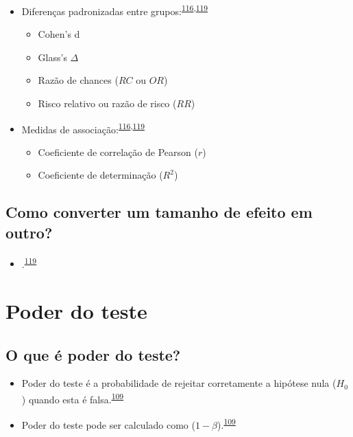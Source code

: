 \documentclass[
  a4paper,
]{book}
\providecommand{\tightlist}{%
  \setlength{\itemsep}{0pt}\setlength{\parskip}{0pt}}
\begin{document}
\begin{itemize}
\item
  Diferenças padronizadas entre grupos:\textsuperscript{\protect\hyperlink{ref-Sullivan2012}{116},\protect\hyperlink{ref-Kim2015}{119}}

  \begin{itemize}
  \item
    Cohen's d
  \item
    Glass's \(\Delta\)
  \item
    Razão de chances (\(RC\) ou \(OR\))
  \item
    Risco relativo ou razão de risco (\(RR\))
  \end{itemize}
\item
  Medidas de associação:\textsuperscript{\protect\hyperlink{ref-Sullivan2012}{116},\protect\hyperlink{ref-Kim2015}{119}}

  \begin{itemize}
  \item
    Coeficiente de correlação de Pearson (\(r\))
  \item
    Coeficiente de determinação (\(R^2\))
  \end{itemize}
\end{itemize}

\hypertarget{como-converter-um-tamanho-de-efeito-em-outro}{%
\subsection{Como converter um tamanho de efeito em outro?}\label{como-converter-um-tamanho-de-efeito-em-outro}}

\begin{itemize}
\tightlist
\item
  .\textsuperscript{\protect\hyperlink{ref-Kim2015}{119}}
\end{itemize}

\hypertarget{poder-teste}{%
\section{Poder do teste}\label{poder-teste}}

\hypertarget{o-que-uxe9-poder-do-teste}{%
\subsection{O que é poder do teste?}\label{o-que-uxe9-poder-do-teste}}

\begin{itemize}
\item
  Poder do teste é a probabilidade de rejeitar corretamente a hipótese nula (\(H_{0}\)) quando esta é falsa.\textsuperscript{\protect\hyperlink{ref-Curran-Everett2009}{109}}
\item
  Poder do teste pode ser calculado como (\(1 - \beta\)).\textsuperscript{\protect\hyperlink{ref-Curran-Everett2009}{109}}
\end{itemize}
\end{document}
